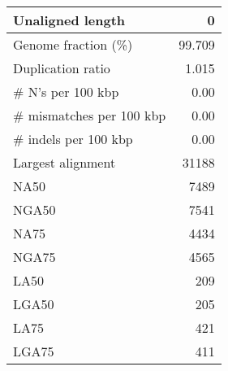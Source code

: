 \documentclass[12pt,a4paper]{article}
\begin{document}
\begin{table}[ht]
\begin{center}
\begin{tabular}{|l*{1}{|r}|}
Unaligned length & 0 \\ \hline
Genome fraction (\%) & 99.709 \\ \hline
Duplication ratio & 1.015 \\ \hline
\# N's per 100 kbp & 0.00 \\ \hline
\# mismatches per 100 kbp & 0.00 \\ \hline
\# indels per 100 kbp & 0.00 \\ \hline
Largest alignment & 31188 \\ \hline
NA50 & 7489 \\ \hline
NGA50 & 7541 \\ \hline
NA75 & 4434 \\ \hline
NGA75 & 4565 \\ \hline
LA50 & 209 \\ \hline
LGA50 & 205 \\ \hline
LA75 & 421 \\ \hline
LGA75 & 411 \\ \hline
\end{tabular}
\end{center}
\end{table}
\end{document}
